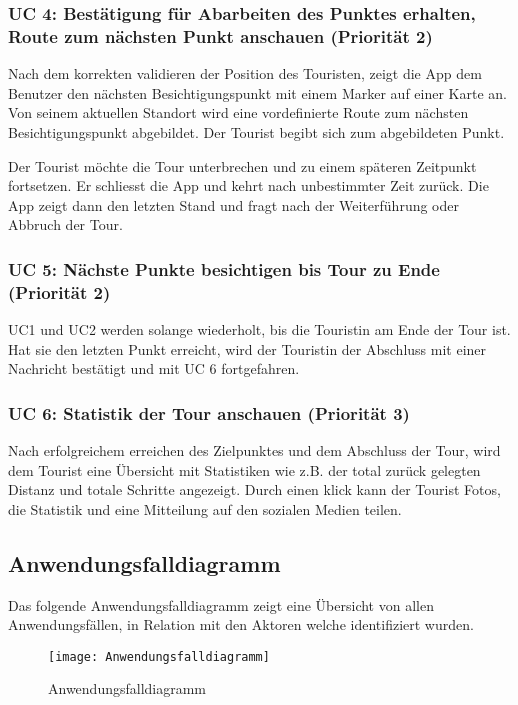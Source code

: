 \subsubsection{UC 4: Bestätigung für Abarbeiten des Punktes erhalten, Route zum nächsten Punkt anschauen (Priorität 2)}\label{uc-4-user-bekommt-bestuxe4tigung-fuxfcr-das-abarbeiten-des-punktes-die-route-zum-nuxe4chsten-punkt-wird-angezeigt.-priorituxe4t-2}
\label{erfolgszenario-2}
Nach dem korrekten validieren der Position des Touristen, zeigt die App
dem Benutzer den nächsten Besichtigungspunkt mit einem Marker auf einer
Karte an. Von seinem aktuellen Standort wird eine vordefinierte Route
zum nächsten Besichtigungspunkt abgebildet. Der Tourist begibt sich zum
abgebildeten Punkt.


\label{alternativszenario-1}
Der Tourist möchte die Tour unterbrechen und zu einem späteren
Zeitpunkt fortsetzen. Er schliesst die App und kehrt nach unbestimmter
Zeit zurück. Die App zeigt dann den letzten Stand und fragt nach der
Weiterführung oder Abbruch der Tour.


\subsubsection{UC 5: Nächste Punkte besichtigen bis Tour zu Ende (Priorität 2)}\label{uc-5-user-besucht-nuxe4chste-punkte-bis-tour-zu-ende.-priorituxe4t-2}
UC1 und UC2 werden solange wiederholt, bis die Touristin am Ende der Tour
ist. Hat sie den letzten Punkt erreicht, wird der Touristin der Abschluss
mit einer Nachricht bestätigt und mit UC 6 fortgefahren.


\subsubsection{UC 6: Statistik der Tour anschauen (Priorität 3)}\label{uc-6-user-sieht-statistik-der-tour.-priorituxe4t-3}
Nach erfolgreichem erreichen des Zielpunktes und dem Abschluss der Tour,
wird dem Tourist eine Übersicht mit Statistiken wie z.B. der total
zurück gelegten Distanz und totale Schritte angezeigt. Durch einen klick
kann der Tourist Fotos, die Statistik und eine Mitteilung auf den
sozialen Medien teilen.


\subsection{Anwendungsfalldiagramm}\label{anwendungsfalldiagramm}
Das folgende Anwendungsfalldiagramm zeigt eine Übersicht von allen Anwendungsfällen, in Relation mit den Aktoren welche identifiziert wurden.

\begin{figure}
  \centering
  \texttt{[image: Anwendungsfalldiagramm]}
  \caption{Anwendungsfalldiagramm}
\end{figure}
